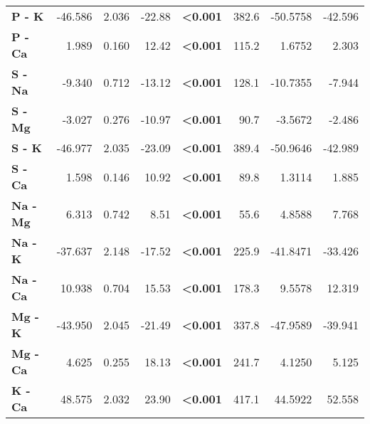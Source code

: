 \begin{table}[H]
\begin{tabular}[t]{>{}lrrr>{}rrrr}
\textbf{P - K} & -46.586 & 2.036 & -22.88 & \textbf{<0.001} & 382.6 & -50.5758 & -42.596\\
\textbf{P - Ca} & 1.989 & 0.160 & 12.42 & \textbf{<0.001} & 115.2 & 1.6752 & 2.303\\
\textbf{S - Na} & -9.340 & 0.712 & -13.12 & \textbf{<0.001} & 128.1 & -10.7355 & -7.944\\
\textbf{S - Mg} & -3.027 & 0.276 & -10.97 & \textbf{<0.001} & 90.7 & -3.5672 & -2.486\\
\textbf{S - K} & -46.977 & 2.035 & -23.09 & \textbf{<0.001} & 389.4 & -50.9646 & -42.989\\
\textbf{S - Ca} & 1.598 & 0.146 & 10.92 & \textbf{<0.001} & 89.8 & 1.3114 & 1.885\\
\textbf{Na - Mg} & 6.313 & 0.742 & 8.51 & \textbf{<0.001} & 55.6 & 4.8588 & 7.768\\
\textbf{Na - K} & -37.637 & 2.148 & -17.52 & \textbf{<0.001} & 225.9 & -41.8471 & -33.426\\
\textbf{Na - Ca} & 10.938 & 0.704 & 15.53 & \textbf{<0.001} & 178.3 & 9.5578 & 12.319\\
\textbf{Mg - K} & -43.950 & 2.045 & -21.49 & \textbf{<0.001} & 337.8 & -47.9589 & -39.941\\
\textbf{Mg - Ca} & 4.625 & 0.255 & 18.13 & \textbf{<0.001} & 241.7 & 4.1250 & 5.125\\
\textbf{K - Ca} & 48.575 & 2.032 & 23.90 & \textbf{<0.001} & 417.1 & 44.5922 & 52.558\\
\bottomrule
\end{tabular}
\end{table}
